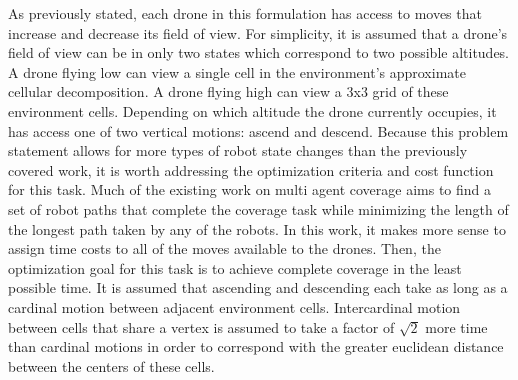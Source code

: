 As previously stated, each drone in this formulation has access to moves that increase and decrease its field of view. For simplicity, it is assumed that a drone's field of view can be in only two states which correspond to two possible altitudes. A drone flying low can view a single cell in the environment's approximate cellular decomposition. A drone flying high can view a 3x3 grid of these environment cells. Depending on which altitude the drone currently occupies, it has access one of two vertical motions: ascend and descend. Because this problem statement allows for more types of robot state changes than the previously covered work, it is worth addressing the optimization criteria and cost function for this task. Much of the existing work on multi agent coverage aims to find a set of robot paths that complete the coverage task while minimizing the length of the longest path taken by any of the robots. In this work, it makes more sense to assign time costs to all of the moves available to the drones. Then, the optimization goal for this task is to achieve complete coverage in the least possible time. It is assumed that ascending and descending each take as long as a cardinal motion between adjacent environment cells. Intercardinal motion between cells that share a vertex is assumed to take a factor of $ \sqrt{2} $ more time than cardinal motions in order to correspond with the greater euclidean distance between the centers of these cells.
